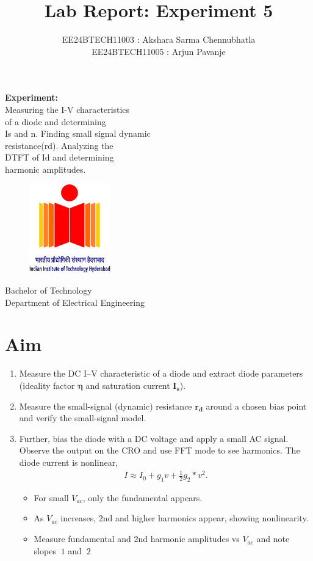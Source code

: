 \documentclass[12pt,a4paper]{article}
\title{\textbf{Lab Report: Experiment 5}}
\author{EE24BTECH11003 : Akshara Sarma Chennubhatla\\EE24BTECH11005 : Arjun Pavanje}
\begin{document}
\maketitle
\begin{center}
	\textbf{Experiment:\\}Measuring the I-V characteristics\\of a diode and determining\\Is and n. Finding small signal dynamic\\resistance(rd). Analyzing the\\DTFT of Id and determining\\harmonic amplitudes.
\end{center}
\vspace{30pt}
\begin{figure}[h!]
	\centering
	\includegraphics[width = 100pt]{logo.png}\\
\end{figure}
\begin{center}
	Bachelor of Technology\\
	\vspace{10pt}
	Department of Electrical Engineering\\
\end{center}
\newpage


\section{Aim}
\begin{enumerate}
\item Measure the DC I–V characteristic of a diode and extract diode parameters (ideality factor $\mathbf{\eta}$ and saturation current $\mathbf{I_s}$). 
\item Measure the small-signal (dynamic) resistance $\mathbf{r_d}$ around a chosen bias point and verify the small-signal model. 
\item Further, bias the diode with a DC voltage and apply a small AC signal. Observe the output on the CRO and use FFT mode to see harmonics. The diode current is nonlinear,
\begin{align*}
I \approx I_0 + g_1v + \frac{1}{2}g_2*v^2.
\end{align*}
\begin{itemize}
\item For small $V_{ac}$, only the fundamental appears. 
\item As $V_{ac}$ increases, 2nd and higher harmonics appear, showing nonlinearity. 
\item Measure fundamental and 2nd harmonic amplitudes vs $V_{ac}$ and note slopes $~1$ and $~2$
\end{itemize}
\end{enumerate}
\end{document}
